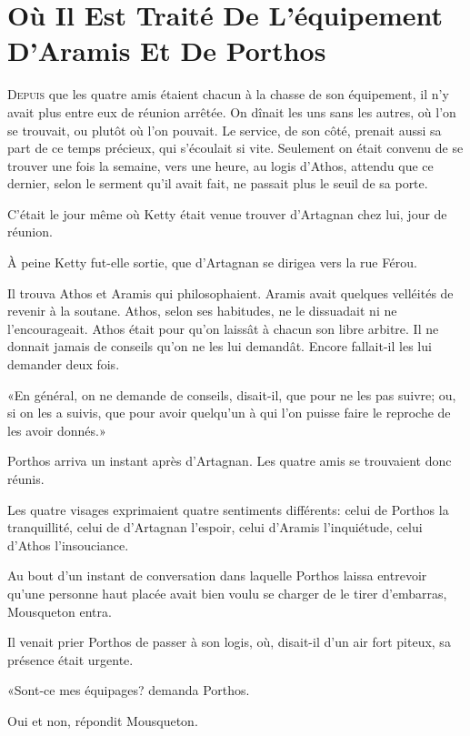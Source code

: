 
\chapter[L'équipement D'Aramis Et De Porthos]{Où Il Est Traité De L'équipement D'Aramis Et De Porthos}

\lettrine{D}{epuis} que les quatre amis étaient chacun à la chasse de son équipement, il n'y avait plus entre eux de réunion arrêtée. On dînait les uns sans les autres, où l'on se trouvait, ou plutôt où l'on pouvait. Le service, de son côté, prenait aussi sa part de ce temps précieux, qui s'écoulait si vite. Seulement on était convenu de se trouver une fois la semaine, vers une heure, au logis d'Athos, attendu que ce dernier, selon le serment qu'il avait fait, ne passait plus le seuil de sa porte. 

C'était le jour même où Ketty était venue trouver d'Artagnan chez lui, jour de réunion. 

À peine Ketty fut-elle sortie, que d'Artagnan se dirigea vers la rue Férou. 

Il trouva Athos et Aramis qui philosophaient. Aramis avait quelques velléités de revenir à la soutane. Athos, selon ses habitudes, ne le dissuadait ni ne l'encourageait. Athos était pour qu'on laissât à chacun son libre arbitre. Il ne donnait jamais de conseils qu'on ne les lui demandât. Encore fallait-il les lui demander deux fois. 

«En général, on ne demande de conseils, disait-il, que pour ne les pas suivre; ou, si on les a suivis, que pour avoir quelqu'un à qui l'on puisse faire le reproche de les avoir donnés.» 

Porthos arriva un instant après d'Artagnan. Les quatre amis se trouvaient donc réunis. 

Les quatre visages exprimaient quatre sentiments différents: celui de Porthos la tranquillité, celui de d'Artagnan l'espoir, celui d'Aramis l'inquiétude, celui d'Athos l'insouciance. 

Au bout d'un instant de conversation dans laquelle Porthos laissa entrevoir qu'une personne haut placée avait bien voulu se charger de le tirer d'embarras, Mousqueton entra. 

Il venait prier Porthos de passer à son logis, où, disait-il d'un air fort piteux, sa présence était urgente. 

«Sont-ce mes équipages? demanda Porthos. 

\speak  Oui et non, répondit Mousqueton. 

